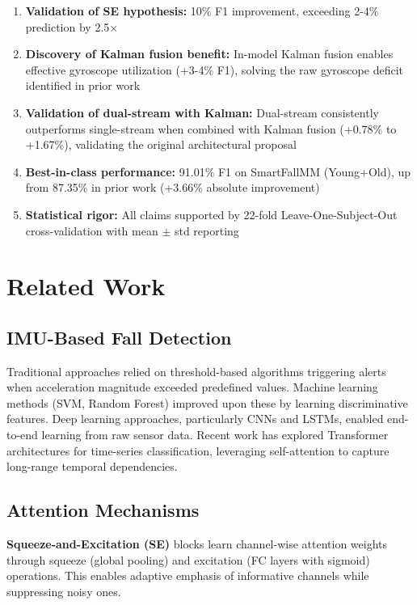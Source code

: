 \documentclass{article}
\begin{document}
\begin{enumerate}
    \item \textbf{Validation of SE hypothesis:} 10\% F1 improvement, exceeding 2-4\% prediction by 2.5$\times$
    \item \textbf{Discovery of Kalman fusion benefit:} In-model Kalman fusion enables effective gyroscope utilization (+3-4\% F1), solving the raw gyroscope deficit identified in prior work
    \item \textbf{Validation of dual-stream with Kalman:} Dual-stream consistently outperforms single-stream when combined with Kalman fusion (+0.78\% to +1.67\%), validating the original architectural proposal
    \item \textbf{Best-in-class performance:} 91.01\% F1 on SmartFallMM (Young+Old), up from 87.35\% in prior work (+3.66\% absolute improvement)
    \item \textbf{Statistical rigor:} All claims supported by 22-fold Leave-One-Subject-Out cross-validation with mean $\pm$ std reporting
\end{enumerate}

\section{Related Work}

\subsection{IMU-Based Fall Detection}

Traditional approaches relied on threshold-based algorithms triggering alerts when acceleration magnitude exceeded predefined values. Machine learning methods (SVM, Random Forest) improved upon these by learning discriminative features. Deep learning approaches, particularly CNNs and LSTMs, enabled end-to-end learning from raw sensor data. Recent work has explored Transformer architectures for time-series classification, leveraging self-attention to capture long-range temporal dependencies.

\subsection{Attention Mechanisms}

\textbf{Squeeze-and-Excitation (SE)} blocks learn channel-wise attention weights through squeeze (global pooling) and excitation (FC layers with sigmoid) operations. This enables adaptive emphasis of informative channels while suppressing noisy ones.
\end{document}
